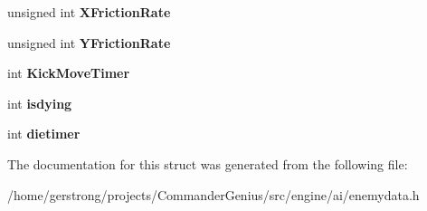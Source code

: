 \begin{DoxyCompactItemize}
\item 
\hypertarget{structst_ninja_data_a90a2659bc2a10fbaa05fada51e7481fb}{
unsigned int {\bfseries XFrictionRate}}
\label{structst_ninja_data_a90a2659bc2a10fbaa05fada51e7481fb}

\item 
\hypertarget{structst_ninja_data_a2e27e83fb9897731210b26c260e36eb1}{
unsigned int {\bfseries YFrictionRate}}
\label{structst_ninja_data_a2e27e83fb9897731210b26c260e36eb1}

\item 
\hypertarget{structst_ninja_data_af588fbe2c0c14274ce440d6db9754747}{
int {\bfseries KickMoveTimer}}
\label{structst_ninja_data_af588fbe2c0c14274ce440d6db9754747}

\item 
\hypertarget{structst_ninja_data_a057b13f20a7162ade50ec29dfe81aad2}{
int {\bfseries isdying}}
\label{structst_ninja_data_a057b13f20a7162ade50ec29dfe81aad2}

\item 
\hypertarget{structst_ninja_data_af69c01f8cb4cd7c8c78b79c0163cb0f6}{
int {\bfseries dietimer}}
\label{structst_ninja_data_af69c01f8cb4cd7c8c78b79c0163cb0f6}

\end{DoxyCompactItemize}


The documentation for this struct was generated from the following file:\begin{DoxyCompactItemize}
\item 
/home/gerstrong/projects/CommanderGenius/src/engine/ai/enemydata.h\end{DoxyCompactItemize}
